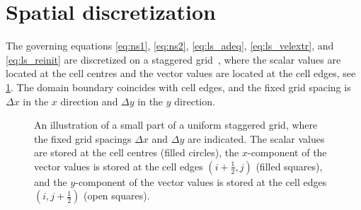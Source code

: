 \documentclass[11pt,b5paper,DIV=calc,BCOR1.3cm,headings=small,%
               footinclude=false,headsepline]{scrbook}
\begin{document}
\section{Spatial discretization}
\label{sec:x-discr}
The governing equations \eqref{eq:ns1}, \eqref{eq:ns2}, \eqref{eq:ls_adeq},
\eqref{eq:ls_velextr}, and \eqref{eq:ls_reinit} are discretized on a staggered
grid~\cite{Harlow65}, where the scalar values are located at the cell centres
and the vector values are located at the cell edges, see
\cref{fig:staggered-grid}.  The domain boundary coincides with cell edges, and
the fixed grid spacing is $\Delta x$ in the $x$ direction and $\Delta y$ in the
$y$ direction.
\begin{figure}[tbp]
  \centering
  \caption{An illustration of a small part of a uniform staggered grid, where
    the fixed grid spacings $\Delta x$ and $\Delta y$ are indicated.  The
    scalar values are stored at the cell centres (filled circles), the
    $x$-component of the vector values is stored at the cell edges $(i+\frac
    1 2,j)$ (filled squares), and the $y$-component of the vector values is
    stored at the cell edges $(i,j+\frac 1 2)$ (open squares).}
  \label{fig:staggered-grid}
\end{figure}
\end{document}
